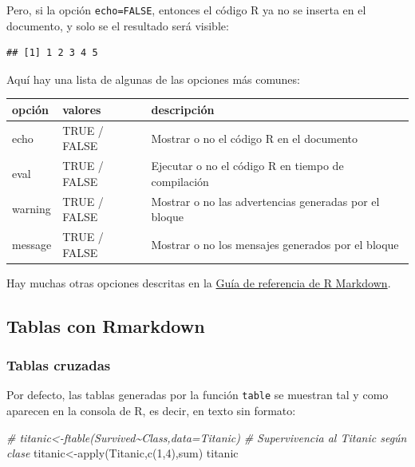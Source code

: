 \documentclass[
]{article}
\newenvironment{Shaded}{\begin{snugshade}}{\end{snugshade}}
\newcommand{\CommentTok}[1]{\textcolor[rgb]{0.56,0.35,0.01}{\textit{#1}}}
\newcommand{\DecValTok}[1]{\textcolor[rgb]{0.00,0.00,0.81}{#1}}
\newcommand{\FunctionTok}[1]{\textcolor[rgb]{0.00,0.00,0.00}{#1}}
\newcommand{\NormalTok}[1]{#1}
\newcommand{\OtherTok}[1]{\textcolor[rgb]{0.56,0.35,0.01}{#1}}
\numberwithin{ejcnt}{section}
\begin{document}
Pero, si la opción \texttt{echo=FALSE}, entonces el código R ya no se inserta en el documento, y solo se el resultado será visible:

\begin{verbatim}
## [1] 1 2 3 4 5
\end{verbatim}

Aquí hay una lista de algunas de las opciones más comunes:

\begin{longtable}[]{@{}lll@{}}
\toprule
opción & valores & descripción \\
\midrule
\endhead
echo & TRUE / FALSE & Mostrar o no el código R en el documento \\
eval & TRUE / FALSE & Ejecutar o no el código R en tiempo de compilación \\
warning & TRUE / FALSE & Mostrar o no las advertencias generadas por el bloque \\
message & TRUE / FALSE & Mostrar o no los mensajes generados por el bloque \\
\bottomrule
\end{longtable}

Hay muchas otras opciones descritas en la \href{https://www.rstudio.com/wp-content/uploads/2015/03/rmarkdown-reference.pdf}{Guía de referencia de R Markdown}.

\hypertarget{tablas-con-rmarkdown}{%
\subsection{Tablas con Rmarkdown}\label{tablas-con-rmarkdown}}

\hypertarget{tablas-cruzadas}{%
\subsubsection{Tablas cruzadas}\label{tablas-cruzadas}}

Por defecto, las tablas generadas por la función \texttt{table} se muestran tal y como aparecen en la consola de R, es decir, en texto sin formato:

\begin{Shaded}
\begin{Highlighting}[]
\CommentTok{\# titanic\textless{}{-}ftable(Survived\textasciitilde{}Class,data=Titanic)}
\CommentTok{\# Supervivencia al Titanic según clase}
\NormalTok{titanic}\OtherTok{\textless{}{-}}\FunctionTok{apply}\NormalTok{(Titanic,}\FunctionTok{c}\NormalTok{(}\DecValTok{1}\NormalTok{,}\DecValTok{4}\NormalTok{),sum)}
\NormalTok{titanic}
\end{Highlighting}
\end{Shaded}
\end{document}
